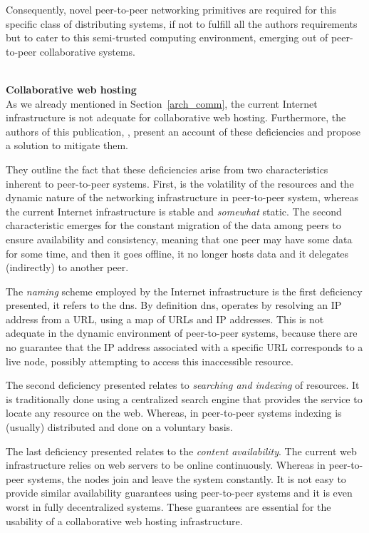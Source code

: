 \documentclass[12pt, titlepage]{uo_temp}
\begin{document}
     Consequently, novel peer-to-peer networking primitives are required for this specific
     class of distributing systems, if not to fulfill all the authors requirements but to
     cater to this semi-trusted computing environment, emerging out of peer-to-peer
     collaborative systems. 
     
     \\ \textbf{Collaborative web hosting} \\ 
     As we already mentioned in Section~\ref{arch_comm}, the current Internet
     infrastructure is not adequate for collaborative web hosting. Furthermore, the
     authors of this publication, \cite{ahmed2014collaborative}, present an account of
     these deficiencies and propose a solution to mitigate them.

     They outline the fact that these deficiencies arise from two characteristics inherent
     to peer-to-peer systems. First, is the volatility of the resources and the dynamic
     nature of the networking infrastructure in peer-to-peer system, whereas the current
     Internet infrastructure is stable and \emph{somewhat} static. The second
     characteristic emerges for the constant migration of the data among peers to ensure
     availability and consistency, meaning that one peer may have some data for some time,
     and then it goes offline, it no longer hosts data and it delegates (indirectly) to
     another peer.

     The \emph{naming} scheme employed by the Internet infrastructure is the first
     deficiency presented, it refers to the \gls{dns}. By definition \gls{dns}, operates
     by resolving an IP address from a URL, using a map of URLs and IP addresses. This is
     not adequate in the dynamic environment of peer-to-peer systems, because there are no
     guarantee that the IP address associated with a specific URL corresponds to a live
     node, possibly attempting to access this inaccessible resource.

     The second deficiency presented relates to \emph{searching and indexing} of
     resources. It is traditionally done using a centralized search engine that provides
     the service to locate any resource on the web. Whereas, in peer-to-peer systems
     indexing is (usually) distributed and done on a voluntary basis.
     
     The last deficiency presented relates to the \emph{content availability}. The current
     web infrastructure relies on web servers to be online continuously.  Whereas in
     peer-to-peer systems, the nodes join and leave the system constantly. It is not easy
     to provide similar availability guarantees using peer-to-peer systems and it is even
     worst in fully decentralized systems. These guarantees are essential for the
     usability of a collaborative web hosting infrastructure.
     
\end{document}
